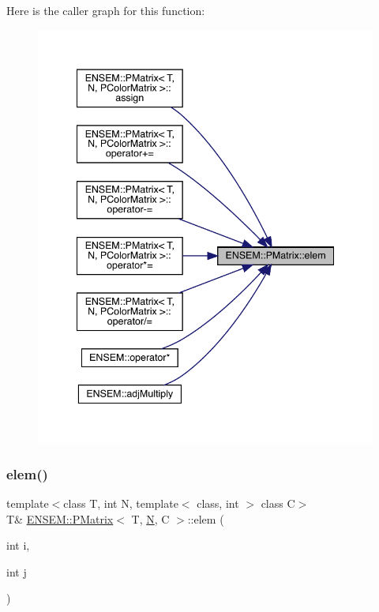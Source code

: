 Here is the caller graph for this function\+:\nopagebreak
\begin{figure}[H]
\begin{center}
\leavevmode
\includegraphics[width=341pt]{d6/def/classENSEM_1_1PMatrix_a358c5f1cd954ddda32677d9ad8765ef2_icgraph}
\end{center}
\end{figure}
\mbox{\label{classENSEM_1_1PMatrix_a358c5f1cd954ddda32677d9ad8765ef2}} 
\subsubsection{\texorpdfstring{elem()}{elem()}\hspace{0.1cm}{\footnotesize\ttfamily [2/4]}}
{\footnotesize\ttfamily template$<$class T, int N, template$<$ class, int $>$ class C$>$ \\
T\& \mbox{\hyperlink{classENSEM_1_1PMatrix}{E\+N\+S\+E\+M\+::\+P\+Matrix}}$<$ T, \mbox{\hyperlink{operator__name__util_8cc_a7722c8ecbb62d99aee7ce68b1752f337}{N}}, C $>$\+::elem (\begin{DoxyParamCaption}\item[{int}]{i,  }\item[{int}]{j }\end{DoxyParamCaption})\hspace{0.3cm}{\ttfamily [inline]}}

